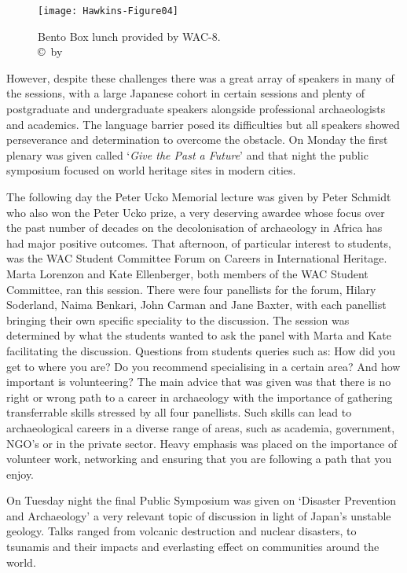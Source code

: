 \begin{figure}[!htb] %
	\texttt{[image: Hawkins-Figure04]}
	\caption{Bento Box lunch provided by WAC-8. 
		{\normalfont\scriptsize \\ \copyright\ by }}
	\label{fig:Hawkins-Figure04}
\end{figure}

However, despite these challenges there was a great array of speakers in many of the sessions, with a large Japanese cohort in certain sessions and plenty of postgraduate and undergraduate speakers alongside professional archaeologists and academics. The language barrier posed its difficulties but all speakers showed perseverance and determination to overcome the obstacle. On Monday the first plenary was given called ‘\textit{Give the Past a Future}’ and that night the public symposium focused on world heritage sites in modern cities. 

The following day the Peter Ucko Memorial lecture was given by Peter Schmidt who also won the Peter Ucko prize, a very deserving awardee whose focus over the past number of decades on the decolonisation of archaeology in Africa has had major positive outcomes. That afternoon, of particular interest to students, was the WAC Student Committee Forum on Careers in International Heritage. Marta Lorenzon and Kate Ellenberger, both members of the WAC Student Committee, ran this session. There were four panellists for the forum, Hilary Soderland, Naima Benkari, John Carman and Jane Baxter, with each panellist bringing their own specific speciality to the discussion. The session was determined by what the students wanted to ask the panel with Marta and Kate facilitating the discussion. Questions from students queries such as: How did you get to where you are? Do you recommend specialising in a certain area? And how important is volunteering? The main advice that was given was that there is no right or wrong path to a career in archaeology with the importance of gathering transferrable skills stressed by all four panellists. Such skills can lead to archaeological careers in a diverse range of areas, such as academia, government, NGO’s or in the private sector. Heavy emphasis was placed on the importance of volunteer work, networking and ensuring that you are following a path that you enjoy. 

On Tuesday night the final Public Symposium was given on \enquote*{Disaster Prevention and Archaeology} a very relevant topic of discussion in light of Japan’s unstable geology. Talks ranged from volcanic destruction and nuclear disasters, to tsunamis and their impacts and everlasting effect on communities around the world.

